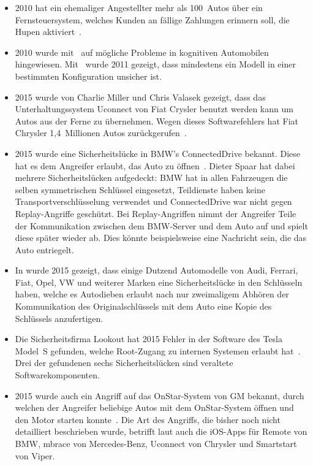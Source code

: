 \begin{itemize}
    \item 2010 hat ein ehemaliger Angestellter mehr als 100~Autos über ein
          Fernsteuersystem, welches Kunden an fällige Zahlungen erinnern soll,
          die Hupen aktiviert~\cite{Poulsen2010}.
    \item 2010 wurde mit~\cite{Koscher2010} auf mögliche Probleme in kognitiven
          Automobilen hingewiesen. Mit~\cite{Checkoway2011} wurde 2011 gezeigt,
          dass mindestens ein Modell in einer bestimmten Konfiguration unsicher
          ist.
    \item 2015 wurde von Charlie Miller und Chris Valasek gezeigt, dass das
          Unterhaltungssystem Uconnect von Fiat Crysler benutzt werden kann um
          Autos aus der Ferne zu übernehmen. Wegen dieses Softwarefehlers hat
          Fiat Chrysler 1,4~Millionen Autos zurückgerufen~\cite{Gallagher2015}.
    \item 2015 wurde eine Sicherheitslücke in BMW's ConnectedDrive bekannt.
          Diese hat es dem Angreifer erlaubt, das Auto zu
          öffnen~\cite{Spaar2015}. Dieter Spaar hat dabei mehrere
          Sicherheitslücken aufgedeckt: BMW hat in allen Fahrzeugen die selben
          symmetrischen Schlüssel eingesetzt, Teildienste haben keine
          Transportverschlüsselung verwendet und ConnectedDrive war nicht gegen
          Replay-Angriffe geschützt. Bei Replay-Angriffen nimmt der Angreifer
          Teile der Kommunikation zwischen dem BMW-Server und dem Auto auf und
          spielt diese später wieder ab. Dies könnte beispielsweise eine
          Nachricht sein, die das Auto entriegelt.
    \item In \cite{Verdult2015} wurde 2015 gezeigt, dass einige Dutzend
          Automodelle von Audi, Ferrari, Fiat, Opel, VW und weiterer Marken
          eine Sicherheitslücke in den Schlüsseln haben, welche es Autodieben
          erlaubt nach nur zweimaligem Abhören der Kommunikation des
          Originalschlüssels mit dem Auto eine Kopie des Schlüssels
          anzufertigen.
    \item Die Sicherheitsfirma Lookout hat 2015 Fehler in der Software des
          Tesla Model~S gefunden, welche Root-Zugang zu internen Systemen
          erlaubt hat~\cite{Mahaffey2015}. Drei der gefundenen sechs
          Sicherheitslücken sind veraltete Softwarekomponenten.
    \item 2015 wurde auch ein Angriff auf das OnStar-System von GM bekannt,
          durch welchen der Angreifer beliebige Autos mit dem OnStar-System
          öffnen und den Motor starten konnte~\cite{Stevens2015}. Die Art des
          Angriffs, die bisher noch nicht detailliert beschrieben wurde,
          betrifft laut \cite{Greenberg2015} auch die iOS-Apps für Remote von
          BMW, mbrace von Mercedes-Benz, Uconnect von Chrysler und Smartstart
          von Viper.
\end{itemize}
